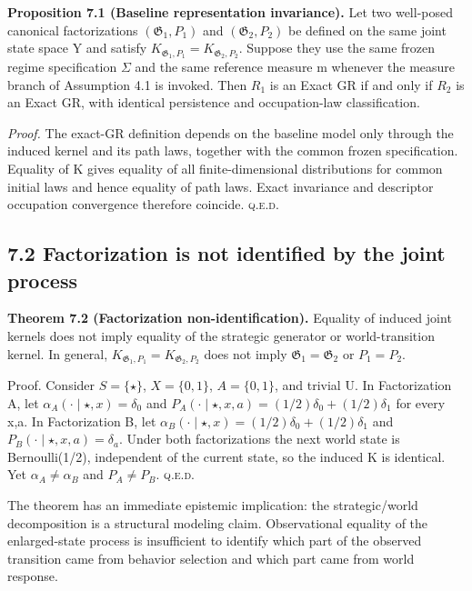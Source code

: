 \documentclass[10pt]{article}
\begin{document}
\textbf{Proposition 7.1 (Baseline representation invariance).} Let two
well-posed canonical factorizations \((\mathfrak G_1,P_1)\) and
\((\mathfrak G_2,P_2)\) be defined on the same joint state space Y and
satisfy \(K_{\mathfrak G_1,P_1}=K_{\mathfrak G_2,P_2}\). Suppose they
use the same frozen regime specification \(\Sigma\) and the same
reference measure m whenever the measure branch of Assumption 4.1 is
invoked. Then \(R_1\) is an Exact GR if and only if \(R_2\) is an Exact
GR, with identical persistence and occupation-law classification.

\emph{Proof.} The exact-GR definition depends on the baseline model only
through the induced kernel and its path laws, together with the common
frozen specification. Equality of K gives equality of all
finite-dimensional distributions for common initial laws and hence
equality of path laws. Exact invariance and descriptor occupation
convergence therefore coincide. \hfill\textsc{q.e.d.}

\subsection{7.2 Factorization is not identified by the joint
process}\label{factorization-is-not-identified-by-the-joint-process}

\textbf{Theorem 7.2 (Factorization non-identification).} Equality of
induced joint kernels does not imply equality of the strategic generator
or world-transition kernel. In general,
\(K_{\mathfrak G_1,P_1}=K_{\mathfrak G_2,P_2}\) does not imply
\(\mathfrak G_1=\mathfrak G_2\) or \(P_1=P_2\).

Proof. Consider \(S=\{\star\}\), \(X=\{0,1\}\), \(A=\{0,1\}\), and
trivial U. In Factorization A, let
\(\alpha_A(\cdot{}\mid \star,x)=\delta_0\) and
\(P_A(\cdot{}\mid \star,x,a)=(1/2)\delta_0+(1/2)\delta_1\) for every
x,a. In Factorization B, let
\(\alpha_B(\cdot{}\mid \star,x)=(1/2)\delta_0+(1/2)\delta_1\) and
\(P_B(\cdot{}\mid \star,x,a)=\delta_a\). Under both factorizations the
next world state is Bernoulli(1/2), independent of the current state, so
the induced K is identical. Yet \(\alpha_A\ne{}\alpha_B\) and
\(P_A\ne{}P_B\). \hfill\textsc{q.e.d.}

The theorem has an immediate epistemic implication: the strategic/world
decomposition is a structural modeling claim. Observational equality of
the enlarged-state process is insufficient to identify which part of the
observed transition came from behavior selection and which part came
from world response.
\end{document}

